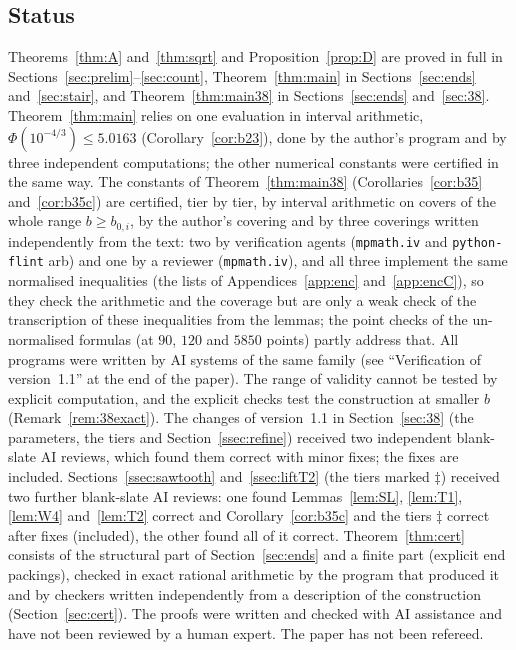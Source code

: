 \documentclass[11pt]{amsart}
\theoremstyle{definition}
\theoremstyle{remark}
\numberwithin{equation}{section}
\begin{document}
\subsection{Status}\label{ssec:status}
Theorems~\ref{thm:A} and~\ref{thm:sqrt} and Proposition~\ref{prop:D} are proved in full in
Sections~\ref{sec:prelim}--\ref{sec:count}, Theorem~\ref{thm:main} in Sections~\ref{sec:ends}
and~\ref{sec:stair}, and Theorem~\ref{thm:main38} in Sections~\ref{sec:ends} and~\ref{sec:38}.
Theorem~\ref{thm:main} relies on one evaluation in interval arithmetic,
$\Phi(10^{-4/3})\le5.0163$ (Corollary~\ref{cor:b23}), done by the author's program and by three independent
computations; the other numerical constants were certified in the same way. The constants of
Theorem~\ref{thm:main38} (Corollaries~\ref{cor:b35} and~\ref{cor:b35c}) are certified, tier by tier, by interval arithmetic on covers of the
whole range $b\ge b_{0,i}$, by the author's covering and by three coverings written independently from the text: two
by verification agents (\texttt{mpmath.iv} and \texttt{python-flint} arb) and one by a reviewer (\texttt{mpmath.iv}), and all three implement the same normalised inequalities (the lists of Appendices~\ref{app:enc} and~\ref{app:encC}), so they check the arithmetic and the coverage but are only a weak check of the transcription of these inequalities from the lemmas; the point checks of the un-normalised formulas (at \(90\), \(120\) and \(5850\) points) partly address that.
All programs were written by AI systems of the same family (see ``Verification of version~1.1'' at the end of the
paper). The range of validity cannot be tested by
explicit computation, and the explicit checks test the construction at smaller $b$ (Remark~\ref{rem:38exact}). The
changes of version~1.1 in Section~\ref{sec:38}
(the parameters, the tiers and Section~\ref{ssec:refine})
received two independent blank-slate AI reviews, which found them correct with minor fixes; the fixes are included.
Sections~\ref{ssec:sawtooth} and~\ref{ssec:liftT2} (the tiers marked $\ddagger$) received two further blank-slate AI
reviews: one found Lemmas~\ref{lem:SL}, \ref{lem:T1}, \ref{lem:W4} and~\ref{lem:T2} correct and
Corollary~\ref{cor:b35c} and the tiers $\ddagger$ correct after fixes (included), the other found all of it correct.
Theorem~\ref{thm:cert} consists of the structural part of Section~\ref{sec:ends} and a finite part (explicit end
packings), checked in exact rational arithmetic by the program that produced it and by checkers written independently
from a description of the construction (Section~\ref{sec:cert}). The proofs were written and checked with AI
assistance and have not been reviewed by a human expert. The paper has not been refereed.
\end{document}
